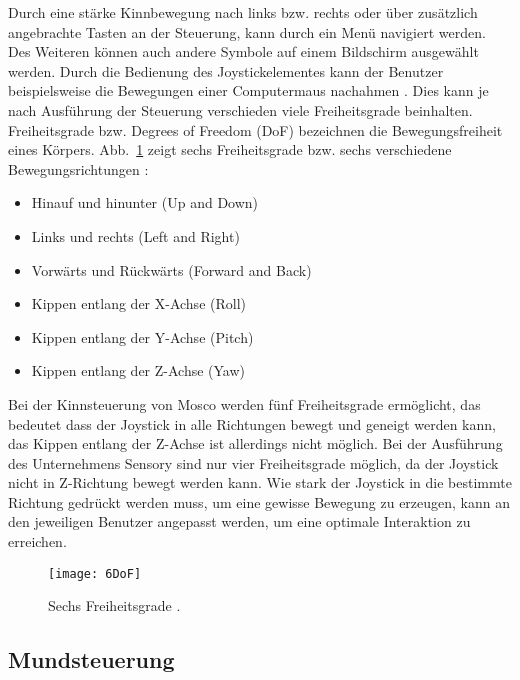 \newline \newline
Durch eine stärke Kinnbewegung nach links bzw. rechts oder über zusätzlich angebrachte Tasten an der Steuerung, kann durch ein Menü navigiert werden. Des Weiteren können auch andere Symbole auf einem Bildschirm ausgewählt werden. Durch die Bedienung des Joystickelementes kann der Benutzer beispielsweise die Bewegungen einer Computermaus nachahmen \cite{MOSO} \cite{SENSORY}. 
\newline \newline
Dies kann je nach Ausführung der Steuerung verschieden viele Freiheitsgrade beinhalten. Freiheitsgrade bzw. Degrees of Freedom (DoF) bezeichnen die Bewegungsfreiheit eines Körpers.
\newline \newline
Abb.~\ref{fig:6DoF} zeigt sechs Freiheitsgrade bzw. sechs verschiedene Bewegungsrichtungen \cite{6DoF}:
\begin{itemize}
      \item Hinauf und hinunter (Up and Down)
      \item Links und rechts (Left and Right)
			\item Vorwärts und Rückwärts (Forward and Back)
			\item Kippen entlang der X-Achse (Roll)
      \item Kippen entlang der Y-Achse (Pitch)
			\item Kippen entlang der Z-Achse (Yaw)
\end{itemize}
%
\vspace{\baselineskip}
Bei der Kinnsteuerung von Mosco werden fünf Freiheitsgrade ermöglicht, das bedeutet dass der Joystick in alle Richtungen bewegt und geneigt werden kann, das Kippen entlang der Z-Achse ist allerdings nicht möglich. Bei der Ausführung des Unternehmens Sensory sind nur vier Freiheitsgrade möglich, da der Joystick nicht in Z-Richtung bewegt werden kann. 
Wie stark der Joystick in die bestimmte Richtung gedrückt werden muss, um eine gewisse Bewegung zu erzeugen, kann an den jeweiligen Benutzer angepasst werden, um eine optimale Interaktion zu erreichen.
%
\begin{figure}
\centering
\texttt{[image: 6DoF]}
\caption{Sechs Freiheitsgrade \cite{6DoFPic}.}
\label{fig:6DoF}
\end{figure}
%
%

\subsection{Mundsteuerung}

